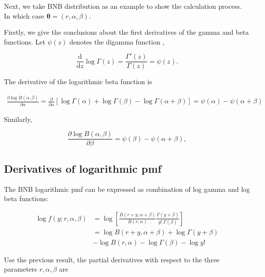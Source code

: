 \documentclass[11pt]{article}
\begin{document}
Next, we take BNB distribution as an example to show the calculation process. In which case $\boldsymbol {\theta}=(r,\alpha,\beta)$. 

Firstly, we give the conclusions about the first derivatives of the gamma and beta functions. Let $\psi(z)$ denotes the digamma function \citep[Ch.~5]{olver2010nist},

\begin{equation}
{\frac {\mathrm {d} }{\mathrm {d} z}}\log \Gamma (z) = {\frac {\Gamma '(z)}{\Gamma (z)}} =\psi (z).
\end{equation}

The derivative of the logarithmic beta function is

\begin{equation}
  \begin{aligned}
  \frac{\partial \log B(\alpha,\beta)}{\partial \alpha} = \frac{\partial}{\partial \alpha}\left[ \log\Gamma(\alpha)+\log\Gamma(\beta)-\log\Gamma(\alpha+\beta) \right] = \psi(\alpha) - \psi(\alpha+\beta)
  \end{aligned}
\end{equation}

Similarly,

\begin{equation}
  \frac{\partial \log B(\alpha,\beta)}{\partial \beta} = \psi(\beta) - \psi(\alpha+\beta),
\end{equation}


\subsection*{Derivatives of logarithmic pmf}

 The BNB logarithmic pmf can be expressed as combination of log gamma and log beta functions:

\begin{equation}
\begin{aligned}
	\log f(y;r, \alpha ,\beta) &= \log\left[ \frac {B (r+y,\alpha +\beta )}{B (r,\alpha )} \frac {\Gamma (y+\beta )}{y!\;\Gamma (\beta )} \right] \\
	&= \log B (r+y,\alpha +\beta ) + \log \Gamma (y+\beta ) \\ 
	&- \log B (r,\alpha ) - \log \Gamma (\beta ) - \log y!
\end{aligned}
\end{equation}

Use the previous result, the partial derivatives with respect to the three parameters $r, \alpha, \beta$ are
\end{document}
